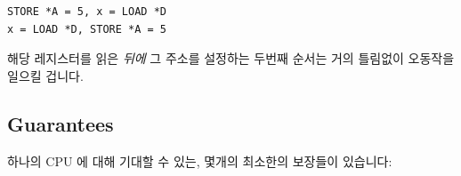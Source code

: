 \vspace{5pt}
\begin{minipage}[t]{\columnwidth}
\scriptsize
\begin{verbatim}
STORE *A = 5, x = LOAD *D
x = LOAD *D, STORE *A = 5
\end{verbatim}
\end{minipage}
\vspace{5pt}

해당 레지스터를 읽은 \emph{뒤에} 그 주소를 설정하는 두번째 순서는 거의 틀림없이
오동작을 일으킬 겁니다.

\subsection{Guarantees}
\label{sec:advsync:Guarantees}

하나의 CPU 에 대해 기대할 수 있는, 몇개의 최소한의 보장들이 있습니다:

